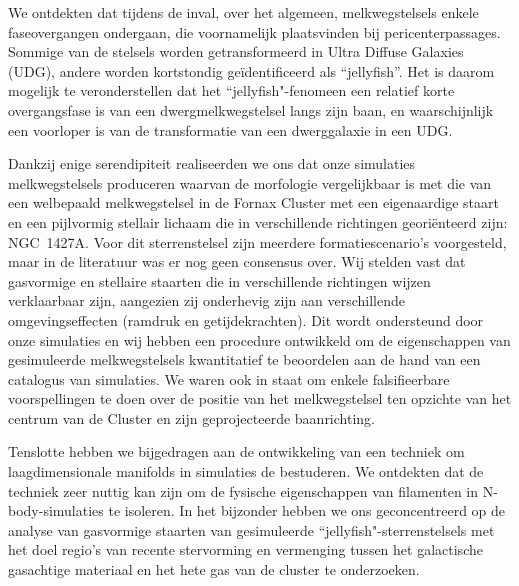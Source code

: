 We ontdekten dat tijdens de inval, over het algemeen, melkwegstelsels enkele faseovergangen ondergaan, die voornamelijk  plaatsvinden bij pericenterpassages.
Sommige van de stelsels  worden getransformeerd in Ultra Diffuse Galaxies (UDG), andere worden kortstondig geïdentificeerd als ``jellyfish''.
Het is daarom mogelijk te veronderstellen dat het ``jellyfish"-fenomeen een relatief korte overgangsfase is van een dwergmelkwegstelsel langs zijn baan, en waarschijnlijk een voorloper is van de transformatie van een dwerggalaxie in een UDG.

Dankzij enige serendipiteit realiseerden we ons dat onze simulaties melkwegstelsels produceren waarvan de morfologie vergelijkbaar is met die van een welbepaald melkwegstelsel in de Fornax Cluster met een eigenaardige  \Hi{} staart en een pijlvormig stellair lichaam die in verschillende richtingen georiënteerd zijn: NGC~1427A.
Voor dit sterrenstelsel zijn meerdere formatiescenario's voorgesteld, maar in de literatuur was er nog geen consensus over.
Wij stelden vast dat gasvormige en stellaire staarten die in verschillende richtingen wijzen verklaarbaar zijn, aangezien zij onderhevig zijn aan verschillende omgevingseffecten (ramdruk en getijdekrachten).
Dit wordt ondersteund door onze simulaties en wij hebben een procedure ontwikkeld om de eigenschappen van gesimuleerde melkwegstelsels kwantitatief te beoordelen aan de hand van een catalogus van simulaties.
We waren ook in staat om enkele falsifieerbare voorspellingen te doen over de positie van het melkwegstelsel ten opzichte van het centrum van de Cluster en zijn geprojecteerde baanrichting.

Tenslotte hebben we bijgedragen aan de ontwikkeling van een techniek om laagdimensionale manifolds in simulaties de bestuderen.
We ontdekten dat de techniek zeer nuttig kan zijn om de fysische eigenschappen van filamenten in N-body-simulaties te isoleren.
In het bijzonder hebben we ons geconcentreerd op de analyse van gasvormige staarten van gesimuleerde ``jellyfish"-sterrenstelsels met het doel regio's van recente stervorming en vermenging tussen het galactische gasachtige materiaal en het hete gas van de cluster te onderzoeken.

